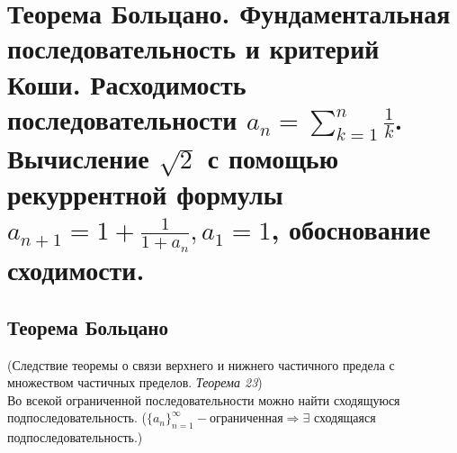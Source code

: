 \documentclass[12pt]{article}
\theoremstyle{definition}
\begin{document}
\section{Теорема Больцано. Фундаментальная последовательность и критерий Коши. Расходимость последовательности $a_n = \sum^n_{k=1}\frac{1}{k}$. Вычисление $\sqrt{2}$ с помощью рекуррентной формулы $a_{n+1} = 1 + \frac{1}{1+a_n}, a_1 = 1$, обоснование сходимости.}
\subsection{Теорема Больцано}
(Следствие теоремы о связи верхнего и нижнего частичного предела с множеством частичных пределов. \textit{Теорема 23}) \\ 
Во всекой ограниченной последовательности можно найти сходящуюся подпоследовательность. ($\{a_n\}^{\infty}_{n=1}-\text{ограниченная} \Rightarrow \exists$ сходящаяся подпоследовательность.)
\end{document}
